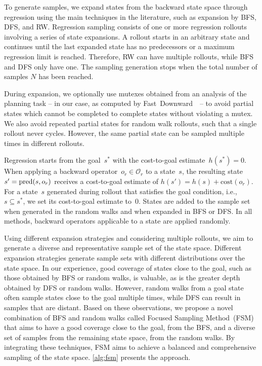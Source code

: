 To generate samples, we expand states from the backward state space through regression using the main techniques in the literature, such as expansion by BFS, DFS, and RW. Regression sampling consists of one or more regression rollouts involving a series of state expansions. A rollout starts in an arbitrary state and continues until the last expanded state has no predecessors or a maximum regression limit is reached. Therefore, RW can have multiple rollouts, while BFS and DFS only have one. The sampling generation stops when the total number of samples $N$ has been reached.

During expansion, we optionally use mutexes obtained from an analysis of the planning task -- in our case, as computed by Fast~Downward~\cite{helmert2006fast}~-- to avoid partial states which cannot be completed to complete states without violating a mutex. We also avoid repeated partial states for random walk rollouts, such that a single rollout never cycles. However, the same partial state can be sampled multiple times in different rollouts.

Regression starts from the goal~$s^*$ with the cost-to-goal estimate~$h(s^*)=0$. When applying a backward operator~$o_r \in \mathcal{O}_r$ to a state~$s$, the resulting state~$s' = \operatorname{pred}(s, o_r)$ receives a cost-to-goal estimate of $h(s') = h(s) + \text{cost}(o_r)$. For a state~$s$ generated during rollout that satisfies the goal condition, i.e.,~$s \subseteq s^*$, we set its cost-to-goal estimate to~$0$. States are added to the sample set when generated in the random walks and when expanded in BFS or DFS. In all methods, backward operators applicable to a state are applied randomly.

Using different expansion strategies and considering multiple rollouts, we aim to generate a diverse and representative sample set of the state space. Different expansion strategies generate sample sets with different distributions over the state space. In our experience, good coverage of states close to the goal, such as those obtained by BFS or random walks, is valuable, as is the greater depth obtained by DFS or random walks. However, random walks from a goal state often sample states close to the goal multiple times, while DFS can result in samples that are distant. Based on these observations, we propose a novel combination of BFS and random walks called Focused Sampling Method~(FSM) that aims to have a good coverage close to the goal, from the BFS, and a diverse set of samples from the remaining state space, from the random walks. By integrating these techniques, FSM aims to achieve a balanced and comprehensive sampling of the state space. \cref{alg:fsm} presents the approach.

